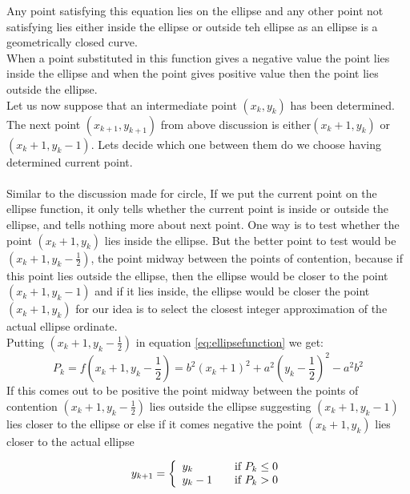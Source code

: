 \documentclass[a4paper,12pt,oneside]{book}
\begin{document}
Any point satisfying this equation lies on the ellipse and any other point not satisfying lies either inside the ellipse or outside teh ellipse as an ellipse is a geometrically closed curve.\\
When a point substituted in this function gives a negative value the point lies inside the ellipse and when the point gives positive value then the point lies outside the ellipse.\\
 Let us now suppose that an intermediate point $(x_k,y_k)$ has been determined. The next point  $(x_{k+1},y_{k+1})$ from above discussion is either$(x_k+1,y_k)$ or $ (x_k+1,y_k-1)$. Lets decide which one between them do we choose having determined current point.\\
  \\ Similar to the discussion made for circle, If we put the current point on the ellipse function, it only tells whether the current point is inside or outside the ellipse, and tells nothing more about next point. One way is to test whether the point $(x_k+1,y_k)$ lies inside the ellipse. But the better point to test would be $(x_k+1,y_k-\frac{1}{2})$, the point midway between the points of contention, because if this point lies outside the ellipse, then the ellipse would be closer to the point $(x_k+1,y_k-1)$ and if it lies inside, the ellipse  would be closer the point $(x_k+1,y_k)$ for our idea is to select the closest integer approximation of the actual ellipse ordinate.\\
   Putting $(x_k+1,y_k-\frac{1}{2})$ in equation \ref{eq:ellipsefunction} we get:
\begin{equation} \label{eq:decisionellipse}
	P_k=f(x_k+1,y_k-\frac{1}{2})=b^2(x_k+1)^2+a^2(y_k-\frac{1}{2})^2-a^2b^2
\end{equation}
If this comes out to be positive the point midway between the points of contention $(x_k+1,y_k-\frac{1}{2})$ lies outside the ellipse suggesting $(x_k+1,y_k-1)$ lies closer to the ellipse or else if it comes negative the point $(x_k+1,y_k)$ lies closer to the actual ellipse
 \begin{center}
	\begin{equation}
		y_{k+1}= \left\{
					\begin{array}{l l}
						y_k & \quad \text{if $P_k \leq 0$}\\
						y_k-1 & \quad \text{if $P_k>0$}
					\end{array}
				\right.
	\end{equation}
\end{center}
\end{document}
